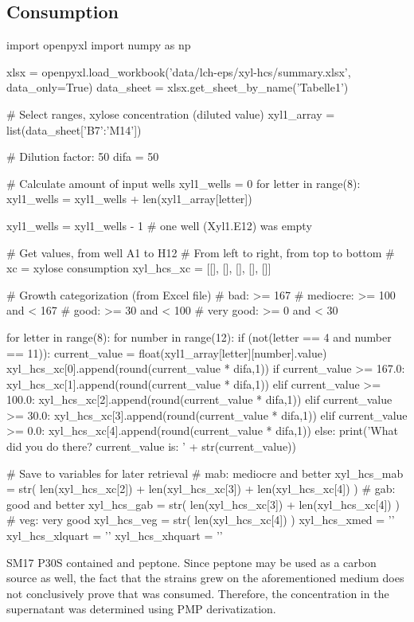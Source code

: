 \subsection{\XYL{} Consumption}
\begin{pycode}
import openpyxl
import numpy as np

xlsx = openpyxl.load_workbook('data/lch-eps/xyl-hcs/summary.xlsx', data_only=True)
data_sheet = xlsx.get_sheet_by_name('Tabelle1')

# Select ranges, xylose concentration (diluted value)
xyl1_array = list(data_sheet['B7':'M14'])

# Dilution factor: 50
difa = 50

# Calculate amount of input wells
xyl1_wells = 0
for letter in range(8):
    xyl1_wells = xyl1_wells + len(xyl1_array[letter])

xyl1_wells = xyl1_wells - 1 # one well (Xyl1.E12) was empty

# Get values, from well A1 to H12
# From left to right, from top to bottom
# xc = xylose consumption
xyl_hcs_xc = [[], [], [], [], []]

# Growth categorization (from Excel file)
# bad:       >= 167
# mediocre:  >= 100 and < 167
# good:      >=  30 and < 100
# very good: >=   0 and <  30


for letter in range(8):
    for number in range(12):
        if (not(letter == 4 and number == 11)):
            current_value = float(xyl1_array[letter][number].value)
            xyl_hcs_xc[0].append(round(current_value * difa,1))
            if current_value >= 167.0:
                xyl_hcs_xc[1].append(round(current_value * difa,1))
            elif current_value >= 100.0:
                xyl_hcs_xc[2].append(round(current_value * difa,1))
            elif current_value >= 30.0:
                xyl_hcs_xc[3].append(round(current_value * difa,1))
            elif current_value >= 0.0:
                xyl_hcs_xc[4].append(round(current_value * difa,1))
            else:
                print('What did you do there? current_value is: ' + str(current_value))

# Save to variables for later retrieval
# mab: mediocre and better
xyl_hcs_mab = str(
    len(xyl_hcs_xc[2]) +
    len(xyl_hcs_xc[3]) +
    len(xyl_hcs_xc[4])
)
# gab: good and better
xyl_hcs_gab = str(
    len(xyl_hcs_xc[3]) +
    len(xyl_hcs_xc[4])
)
# veg: very good
xyl_hcs_veg = str(
    len(xyl_hcs_xc[4])
)
xyl_hcs_xmed = ''
xyl_hcs_xlquart = ''
xyl_hcs_xhquart = ''
\end{pycode}
SM17 P30S contained  \xyl{} and  peptone. Since peptone may be used as a carbon source as well, the fact that the strains grew on the aforementioned medium does not conclusively prove that \xyl{} was consumed. Therefore, the \xyl{} concentration in the supernatant was determined using PMP derivatization.

